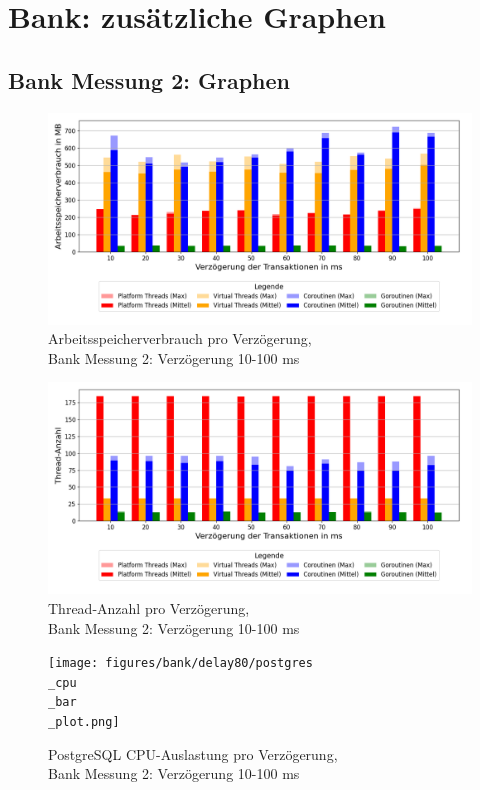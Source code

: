 \documentclass[fontsize=12pt,paper=a4,twoside=semi,parskip=half-,headsepline,headinclude]{scrreprt}
\begin{document}
\section{Bank: zusätzliche Graphen}

\subsection{Bank Messung 2: Graphen}

\begin{figure}[H]
	\centering
	\includegraphics[scale=0.5]{figures/bank/delay80/memory_usage_bar_plot.png}
	\caption{Arbeitsspeicherverbrauch pro Verzögerung,\\ Bank Messung 2: Verzögerung 10-100 ms}
	\label{fig:bankDelay80RAM}
\end{figure}

\begin{figure}[H]
	\centering
	\includegraphics[scale=0.5]{figures/bank/delay80/num_threads_bar_plot.png}
	\caption{Thread-Anzahl pro Verzögerung,\\ Bank Messung 2: Verzögerung 10-100 ms}
	\label{fig:bankDelay80Threads}
\end{figure}

\begin{figure}[H]
	\centering
	\texttt{[image: figures/bank/delay80/postgres\\\_cpu\\\_bar\\\_plot.png]}
	\caption{PostgreSQL CPU-Auslastung pro Verzögerung,\\ Bank Messung 2: Verzögerung 10-100 ms}
	\label{fig:bankDelay80PostgCPU}
\end{figure}
\end{document}
